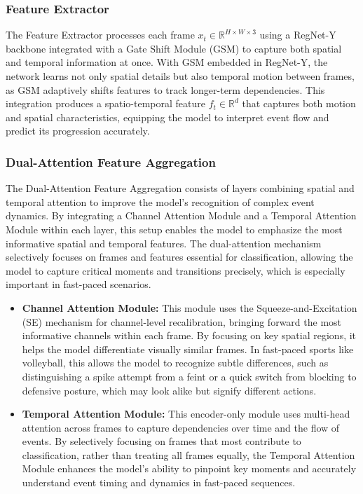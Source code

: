 \documentclass[conference]{IEEEtran}
\begin{document}
\subsubsection{Feature Extractor}
The Feature Extractor processes each frame \( x_t \in \mathbb{R}^{H \times W \times 3} \) using a RegNet-Y backbone integrated with a Gate Shift Module (GSM) to capture both spatial and temporal information at once. With GSM embedded in RegNet-Y, the network learns not only spatial details but also temporal motion between frames, as GSM adaptively shifts features to track longer-term dependencies. This integration produces a spatio-temporal feature \( f_t \in \mathbb{R}^d \) that captures both motion and spatial characteristics, equipping the model to interpret event flow and predict its progression accurately.

\subsubsection{Dual-Attention Feature Aggregation}
The Dual-Attention Feature Aggregation consists of layers combining spatial and temporal attention to improve the model’s recognition of complex event dynamics. By integrating a Channel Attention Module and a Temporal Attention Module within each layer, this setup enables the model to emphasize the most informative spatial and temporal features. The dual-attention mechanism selectively focuses on frames and features essential for classification, allowing the model to capture critical moments and transitions precisely, which is especially important in fast-paced scenarios.


\begin{itemize}
    \item \textbf{Channel Attention Module:} This module uses the Squeeze-and-Excitation (SE) mechanism \cite{8578843} for channel-level recalibration, bringing forward the most informative channels within each frame. By focusing on key spatial regions, it helps the model differentiate visually similar frames. In fast-paced sports like volleyball, this allows the model to recognize subtle differences, such as distinguishing a spike attempt from a feint or a quick switch from blocking to defensive posture, which may look alike but signify different actions.

    \item \textbf{Temporal Attention Module:} This encoder-only module uses multi-head attention \cite{10.5555/3295222.3295349} across frames to capture dependencies over time and the flow of events. By selectively focusing on frames that most contribute to classification, rather than treating all frames equally, the Temporal Attention Module enhances the model’s ability to pinpoint key moments and accurately understand event timing and dynamics in fast-paced sequences.
\end{itemize}
\end{document}
